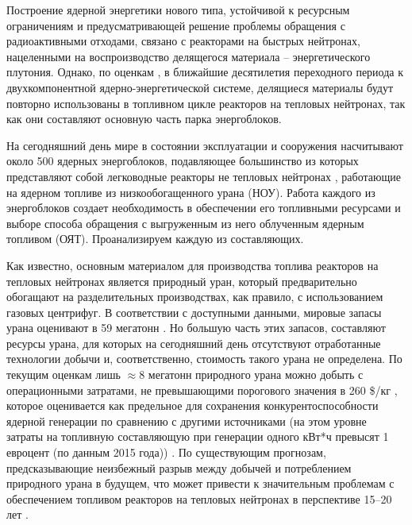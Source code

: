 {\actuality}

Построение ядерной энергетики нового типа, устойчивой к ресурсным ограничениям и предусматривающей решение проблемы обращения с радиоактивными отходами, связано с реакторами на быстрых нейтронах, нацеленными на воспроизводство делящегося материала -- энергетического  плутония. Однако, по оценкам \cite{andrianovaPerspektivnyeToplivnyeZagruzki2015}, в ближайшие десятилетия переходного периода к двухкомпонентной ядерно-энергетической системе, делящиеся материалы будут повторно использованы в топливном цикле реакторов на тепловых нейтронах, так как они составляют основную часть парка энергоблоков.

На сегодняшний день мире в состоянии эксплуатации и сооружения насчитывают около 500 ядерных энергоблоков, подавляющее большинство из которых представляют собой легководные реакторы не тепловых нейтронах \cite{PRISHome}, работающие на ядерном топливе из низкообогащенного урана (НОУ). Работа каждого из энергоблоков создает необходимость в обеспечении его топливными ресурсами и выборе способа обращения с выгруженным из него облученным ядерным топливом (ОЯТ). Проанализируем каждую из составляющих. 

Как известно, основным материалом для производства топлива реакторов на тепловых нейтронах является природный уран, который предварительно обогащают на разделительных производствах, как правило, с использованием газовых центрифуг. В соответствии с доступными данными, мировые запасы урана  оценивают в 59 мегатонн \cite{/content/publication/d82388ab-en}. Но большую часть этих запасов, составляют ресурсы урана, для которых на сегодняшний день отсутствуют отработанные технологии добычи и, соответственно, стоимость такого урана не определена. По текущим оценкам лишь $\approx$8 мегатонн природного урана можно добыть с операционными затратами, не превышающими порогового значения в 260 \$/кг \cite{WorldDistributionUranium2018}, которое оценивается как предельное для сохранения конкурентоспособности ядерной генерации по сравнению с другими источниками (на этом уровне затраты на топливную составляющую при генерации одного кВт*ч превысят 1 евроцент (по данным 2015 года)) \cite{hartardCompetitionConflictsResource2015}. По существующим прогнозам, предсказывающие неизбежный разрыв между добычей и потреблением природного урана в будущем, что может привести к значительным проблемам  с обеспечением топливом реакторов на тепловых нейтронах в перспективе 15--20 лет \cite{international2019iaea}.

